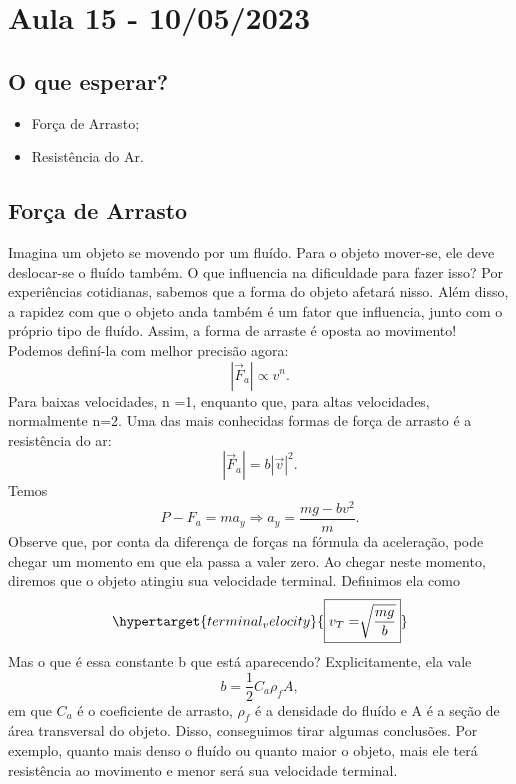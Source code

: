 \documentclass{article}
\begin{document}
\section{Aula 15 - 10/05/2023}
\subsection{O que esperar?}
\begin{itemize}
  \item For\c ca de Arrasto;
  \item Resistência do Ar.
\end{itemize}
\subsection{For\c ca de Arrasto}
  Imagina um objeto se movendo por um fluído. Para o objeto mover-se, ele deve deslocar-se o fluído também. O que influencia na dificuldade para fazer isso?
Por experiências cotidianas, sabemos que a forma do objeto afetará nisso. Além disso, a rapidez com que o objeto anda também é um fator que influencia, junto com o próprio tipo de fluído.
Assim, a forma de arraste é oposta ao movimento! Podemos definí-la com melhor precisão agora: 
  \[
    |\vec{F}_{a}| \varpropto v^{n}.
  \]
  Para baixas velocidades, n =1, enquanto que, para altas velocidades, normalmente n=2. Uma das mais conhecidas formas de for\c ca de arrasto é a resistência do ar: 
    \[
      |\vec{F}_{a}| = b |\vec{v}|^{2}.
    \]
    Temos 
      \[
        P - F_{a} = ma_{y} \Rightarrow a_{y} = \frac{mg - bv^{2}}{m}.
      \]
    Observe que, por conta da diferen\c ca de for\c cas na fórmula da acelera\c cão, pode chegar um momento em que ela passa a valer zero. Ao chegar neste momento,
    diremos que o objeto atingiu sua velocidade terminal. Definimos ela como 
      \[
        \hypertarget{terminal_velocity}{\boxed{v_{T}=\sqrt[]{\frac{mg}{b}}}}
      \]
    Mas o que é essa constante b que está aparecendo? Explicitamente, ela vale 
      \[
        b=\frac{1}{2}C_{a}\rho_{f}A,
      \]
      em que \(C_{a}\) é o coeficiente de arrasto, \(\rho_{f}\) é a densidade do fluído e A é a se\c cão de área transversal do objeto. Disso, conseguimos tirar
    algumas conclusões. Por exemplo, quanto mais denso o fluído ou quanto maior o objeto, mais ele terá resistência ao movimento e menor será sua velocidade terminal.
\end{document}
